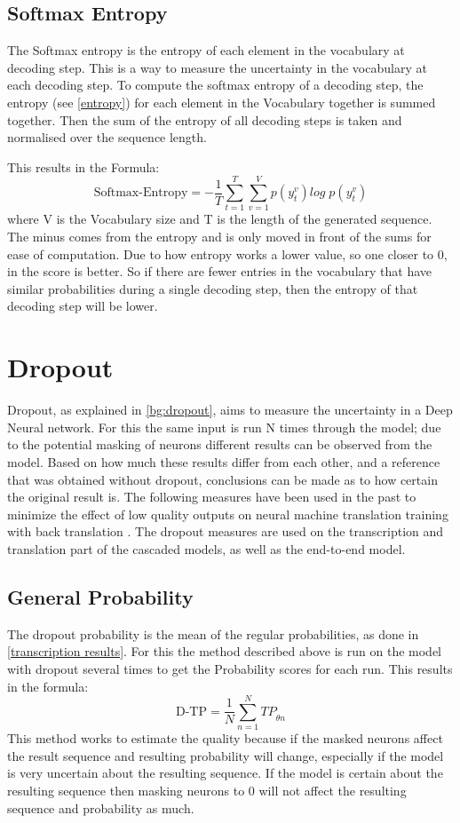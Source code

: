 \subsection{Softmax Entropy}\label{sect:entropy}
The Softmax entropy is the entropy of each element in the vocabulary at decoding step. This is a way to measure the uncertainty in the vocabulary at each decoding step.
To compute the softmax entropy of a decoding step, the entropy (see \autoref{entropy}) for each element in the Vocabulary together is summed together. 
Then the sum of the entropy of all decoding steps is taken and normalised over the sequence length. 

This results in the Formula:
$$\text{Softmax-Entropy}=-\frac{1}{T}\sum_{t=1}^T\sum_{v=1}^V p(y_t^v)log\; p(y_t^v) \label{formula:translation entropy}$$ where V is the Vocabulary size and T is the length of the generated sequence. The minus comes from the entropy and is only moved in front of the sums for ease of computation.
Due to how entropy works a lower value, so one closer to 0, in the score is better. So if there are fewer entries in the vocabulary that have similar probabilities during a single decoding step, then the entropy of that decoding step will be lower.



\section{Dropout}
Dropout, as explained in \autoref{bg:dropout}, aims to measure the uncertainty in a Deep Neural network. 
For this the same input is run N times through the model; due to the potential masking of neurons different results can be observed from the model. Based on how much these results differ from each other, and a reference that was obtained without dropout, conclusions can be made as to how certain the original result is. 
The following measures have been used in the past to minimize the effect of low quality outputs on neural machine translation training with back translation \cite{wang-etal-2018-alibaba}.
The dropout measures are used on the transcription and translation part of the cascaded models, as well as the end-to-end model.


\subsection{General Probability}
\label{dropoutprob}
The dropout probability is the mean of the regular probabilities, as done in \autoref{transcription results}. 
For this the method described above is run on the model with dropout several times to get the Probability scores for each run. 
This results in the formula:
$$\text{D-TP}=\frac{1}{N}\sum_{n=1}^N TP_{\hat\theta n}\label{formula:dropoutprobability}$$
This method works to estimate the quality because if the masked neurons affect the result sequence and resulting probability will change, especially if the model is very uncertain about the resulting sequence. 
If the model is certain about the resulting sequence then masking neurons to 0 will not affect the resulting sequence and probability as much. 

